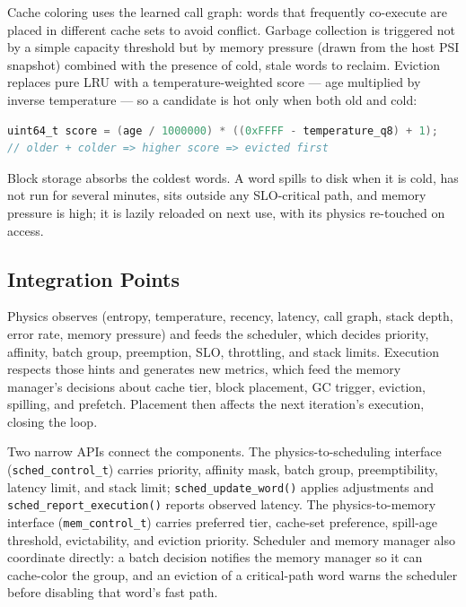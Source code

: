 Cache coloring uses the learned call graph: words that frequently co-execute are
placed in different cache sets to avoid conflict. Garbage collection is triggered
not by a simple capacity threshold but by memory pressure (drawn from the host PSI
snapshot) combined with the presence of cold, stale words to reclaim. Eviction
replaces pure LRU with a temperature-weighted score --- age multiplied by inverse
temperature --- so a candidate is hot only when both old and cold:

\begin{lstlisting}[language=C]
uint64_t score = (age / 1000000) * ((0xFFFF - temperature_q8) + 1);
// older + colder => higher score => evicted first
\end{lstlisting}

Block storage absorbs the coldest words. A word spills to disk when it is cold, has
not run for several minutes, sits outside any SLO-critical path, and memory
pressure is high; it is lazily reloaded on next use, with its physics re-touched on
access.

\subsection{Integration Points}

Physics observes (entropy, temperature, recency, latency, call graph, stack depth,
error rate, memory pressure) and feeds the scheduler, which decides priority,
affinity, batch group, preemption, SLO, throttling, and stack limits. Execution
respects those hints and generates new metrics, which feed the memory manager's
decisions about cache tier, block placement, GC trigger, eviction, spilling, and
prefetch. Placement then affects the next iteration's execution, closing the loop.

Two narrow APIs connect the components. The physics-to-scheduling interface
(\texttt{sched\_control\_t}) carries priority, affinity mask, batch group,
preemptibility, latency limit, and stack limit; \texttt{sched\_update\_word()}
applies adjustments and \texttt{sched\_report\_execution()} reports observed
latency. The physics-to-memory interface (\texttt{mem\_control\_t}) carries
preferred tier, cache-set preference, spill-age threshold, evictability, and
eviction priority. Scheduler and memory manager also coordinate directly: a batch
decision notifies the memory manager so it can cache-color the group, and an
eviction of a critical-path word warns the scheduler before disabling that word's
fast path.

